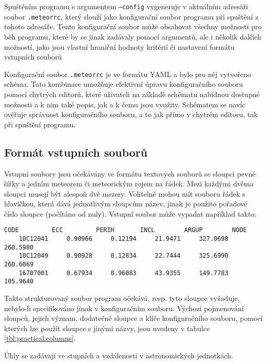 \medskip

Spuštěním programu s argumentem \texttt{---config} vygeneruje v aktuálním adresáři soubor \texttt{.meteorrc}, který slouží jako konfigurační soubor programu při spuštění z tohoto adresáře. Tento konfigurační soubor může obsahovat všechny možnosti pro běh programu, které by se jinak zadávaly pomocí argumentů, ale i několik dalších možností, jako jsou vlastní hraniční hodnoty kritérií či nastavení formátu vstupních souborů

Konfigurační soubor \texttt{.meteorrc} je ve formátu YAML a bylo pro něj vytvořeno schéma. Tato kombinace umožňuje efektivní úpravu konfiguračního souboru pomocí chytrých editorů, které uživateli na základě schématu nabídnou dostupné možnosti a k nim také popis, jak a k čemu jsou využity. Schématem se navíc ověřuje správnost konfiguračního souboru, a to jak přímo v chytrém editoru, tak při spuštění programu.

\subsection{Formát vstupních souborů}
Vstupní soubory jsou očekávány ve formátu textových souborů se sloupci pevné šířky a jedním meteorem či meteorickým rojem na řádek. Mezi každými dvěma sloupci musejí být alespoň dvě mezery. Volitelně mohou mít souboru řádek s hlavičkou, která dává jednotlivým sloupcům název, jinak je použito pořadové číslo sloupce (počítáno od nuly). Vstupní soubor může vypadat například takto:
\begin{Verbatim}[commandchars=\\\{\},gobble=4,formatcom=\footnotesize,codes={\catcode`$=3\catcode`^=7},frame=lines,reflabel=code:practical:input]
    CODE         ECC         PERIH       INCL        ARGUP        NODE
    10C12041     0.90966     0.12194     21.9471     327.0698     260.5980
    10C12049     0.90928     0.12834     22.7444     325.6990     260.6069
    16707001     0.67934     0.96083     43.9355     149.7783     105.9640
\end{Verbatim}

Takto strukturovaný soubor program očekává, resp. tyto sloupce vyžaduje, nebylo-li specifikováno jinak v konfiguračním souboru. Výchozí pojmenování sloupců, jejich význam, dodatečné sloupce a klíče konfiguračního souboru, pomocí kterých lze použít sloupce s jinými názvy, jsou uvedeny v tabulce \ref{tbl:practical:columns}.

Úhly se zadávají ve stupních a vzdálenosti v astronomických jednotkách.

